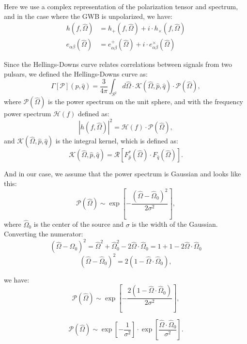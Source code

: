 Here we use a complex representation of the polarization tensor and spectrum, and in the case where the GWB is unpolarized, we have:
\begin{align}
    h(f, \hat{\Omega}) &= h_{+}(f, \hat{\Omega}) + i \cdot h_{\times}(f, \hat{\Omega}) \\
    e_{\alpha \beta}(\hat{\Omega}) &= e^{+}_{\alpha \beta}(\hat{\Omega}) + i \cdot e^{\times}_{\alpha \beta}(\hat{\Omega})
\end{align}

Since the Hellings-Downs curve relates correlations between signals from two pulsars, we defined the Hellings-Downs curve as:
\begin{equation}
\Gamma[\mathcal{P}](\hat{p}, \hat{q}) = \frac{3}{4\pi}\int_{S^2} d \hat{\Omega} \cdot \mathcal{K}(\hat{\Omega}, \hat{p}, \hat{q}) \cdot \mathcal{P}(\hat{\Omega}),
\end{equation}
where $\mathcal{P}(\hat{\Omega})$ is the power spectrum on the unit sphere, and with the frequency power spectrum $\mathcal{H}(f)$ defined as:
\begin{equation}
|h(f, \hat{\Omega})|^2  = \mathcal{H}(f) \cdot \mathcal{P}(\hat{\Omega}),
\end{equation}
and $\mathcal{K}(\hat{\Omega},\hat{p}, \hat{q})$ is the integral kernel, which is defined as:
\begin{equation}
\mathcal{K}(\hat{\Omega},\hat{p}, \hat{q}) = \mathcal{R}\left[F^{*}_{\hat{p}}(\hat{\Omega}) \cdot F_{\hat{q}}(\hat{\Omega})\right].
\end{equation}

And in our case, we assume that the power spectrum is Gaussian and looks like this:
\begin{equation}
\mathcal{P}(\hat{\Omega}) \sim \exp \left[ - \frac{(\hat{\Omega} - \hat{\Omega}_0)^2}{2 \sigma^2} \right],
\end{equation}
where $\hat{\Omega}_0$ is the center of the source and $\sigma$ is the width of the Gaussian. Converting the numerator:
$$
(\hat{\Omega} - \hat{\Omega}_0)^2 = \hat{\Omega}^2 + \hat{\Omega}_0^2 - 2 \hat{\Omega} \cdot \hat{\Omega}_0 = 1 + 1 -  2 \hat{\Omega} \cdot \hat{\Omega}_0
$$
$$
(\hat{\Omega} - \hat{\Omega}_0)^2 = 2 (1 - \hat{\Omega} \cdot \hat{\Omega}_0),
$$

we have:
$$
\mathcal{P}(\hat{\Omega}) \sim \exp \left[ - \frac{2 (1 - \hat{\Omega} \cdot \hat{\Omega}_0)}{2 \sigma^2} \right],
$$

$$
\mathcal{P}(\hat{\Omega}) \sim \exp \left[ - \frac{1}{\sigma^2} \right] \cdot  \exp \left[ \frac{\hat{\Omega} \cdot \hat{\Omega}_0 }{\sigma^2}\right].
$$

